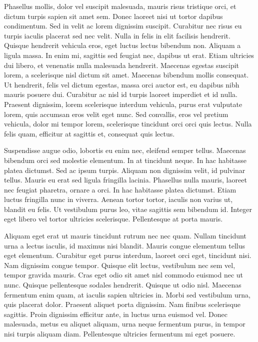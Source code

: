 Phasellus mollis, dolor vel suscipit malesuada, mauris risus tristique orci, et dictum turpis sapien sit amet sem. Donec laoreet nisi ut tortor dapibus condimentum. Sed in velit ac lorem dignissim suscipit. Curabitur nec risus eu turpis iaculis placerat sed nec velit. Nulla in felis in elit facilisis hendrerit. Quisque hendrerit vehicula eros, eget luctus lectus bibendum non. Aliquam a ligula massa. In enim mi, sagittis sed feugiat nec, dapibus ut erat. Etiam ultricies dui libero, et venenatis nulla malesuada hendrerit. Maecenas egestas suscipit lorem, a scelerisque nisl dictum sit amet. Maecenas bibendum mollis consequat. Ut hendrerit, felis vel dictum egestas, massa orci auctor est, eu dapibus nibh mauris posuere dui. Curabitur ac nisl id turpis laoreet imperdiet et id nulla. Praesent dignissim, lorem scelerisque interdum vehicula, purus erat vulputate lorem, quis accumsan eros velit eget nunc. Sed convallis, eros vel pretium vehicula, dolor mi tempor lorem, scelerisque tincidunt orci orci quis lectus. Nulla felis quam, efficitur at sagittis et, consequat quis lectus.

Suspendisse augue odio, lobortis eu enim nec, eleifend semper tellus. Maecenas bibendum orci sed molestie elementum. In at tincidunt neque. In hac habitasse platea dictumst. Sed ac ipsum turpis. Aliquam non dignissim velit, id pulvinar tellus. Mauris eu erat sed ligula fringilla lacinia. Phasellus nulla mauris, laoreet nec feugiat pharetra, ornare a orci. In hac habitasse platea dictumst. Etiam luctus fringilla nunc in viverra. Aenean tortor tortor, iaculis non varius ut, blandit eu felis. Ut vestibulum purus leo, vitae sagittis sem bibendum id. Integer eget libero vel tortor ultricies scelerisque. Pellentesque at porta mauris.

Aliquam eget erat ut mauris tincidunt rutrum nec nec quam. Nullam tincidunt urna a lectus iaculis, id maximus nisi blandit. Mauris congue elementum tellus eget elementum. Curabitur eget purus interdum, laoreet orci eget, tincidunt nisi. Nam dignissim congue tempor. Quisque elit lectus, vestibulum nec sem vel, tempor gravida mauris. Cras eget odio sit amet nisl commodo euismod nec ut nunc. Quisque pellentesque sodales hendrerit. Quisque ut odio nisl. Maecenas fermentum enim quam, at iaculis sapien ultricies in. Morbi sed vestibulum urna, quis placerat dolor. Praesent aliquet porta dignissim. Nam finibus scelerisque sagittis. Proin dignissim efficitur ante, in luctus urna euismod vel. Donec malesuada, metus eu aliquet aliquam, urna neque fermentum purus, in tempor nisi turpis aliquam diam. Pellentesque ultricies fermentum mi eget posuere.


